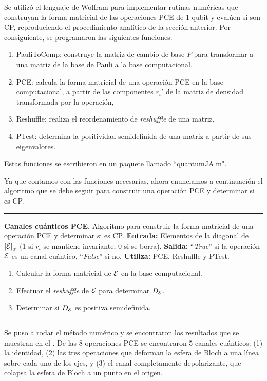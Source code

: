 Se utilizó el lenguaje de Wolfram para implementar 
rutinas numéricas que construyan la forma matricial 
de las operaciones PCE de 1 qubit y evalúen si son CP,
reproduciendo el procedimiento analítico de la sección anterior. 
Por consiguiente, se programaron las siguientes funciones:
\begin{enumerate}
\item PauliToComp: construye la matriz de cambio de base $P$
para transformar a una matriz de la base de Pauli
a la base computacional.
\item PCE: calcula la forma matricial de una operación PCE en la
base computacional, a partir de las componentes $r_i'$ 
de la matriz de densidad transformada por la operación,
\item Reshuffle: realiza el reordenamiento de \textit{reshuffle} de una matriz,
\item PTest: determina la positividad semidefinida de una matriz 
a partir de sus eigenvalores.
\end{enumerate}
Estas funciones se escribieron en un paquete llamado ``quantumJA.m".

Ya que contamos con las funciones necesarias, ahora enunciamos
a continuación el algoritmo que se debe seguir para construir 
una operación PCE y determinar si es CP.

\vspace{1em} \hrule \vspace{1em}
\textbf{Canales cuánticos PCE}.
Algoritmo para construir la forma matricial de una operación 
PCE y determinar si es CP.
\textbf{Entrada:} Elementos de la diagonal de $\qty[\mathcal{E}]_{\sigma}$
(1 si $r_i$ se mantiene invariante, 0 si se borra). 
\textbf{Salida:} ``\textit{True}'' si la operación $\mathcal{E}$ es un canal cuántico,
``\textit{False}'' si no.
\textbf{Utiliza:} PCE, Reshuffle y PTest.
\begin{enumerate}
\item Calcular la forma matricial de $\mathcal{E}$ en la base computacional.
\item Efectuar el \textit{reshuffle} de $\mathcal{E}$ para determinar $D_{\mathcal{E}}$.
\item Determinar si $D_{\mathcal{E}}$ es positiva semidefinida.
\end{enumerate}
\hrule \vspace{1em}


Se puso a rodar el método numérico y se encontraron los
resultados que se muestran en el .
De las 8 operaciones PCE se encontraron 5 canales cuánticos:
(1) la identidad, (2) las tres operaciones 
que deforman la esfera de Bloch a una línea sobre cada uno 
de los ejes, y (3) el canal completamente depolarizante, 
que colapsa la esfera de Bloch a un punto en el origen.

